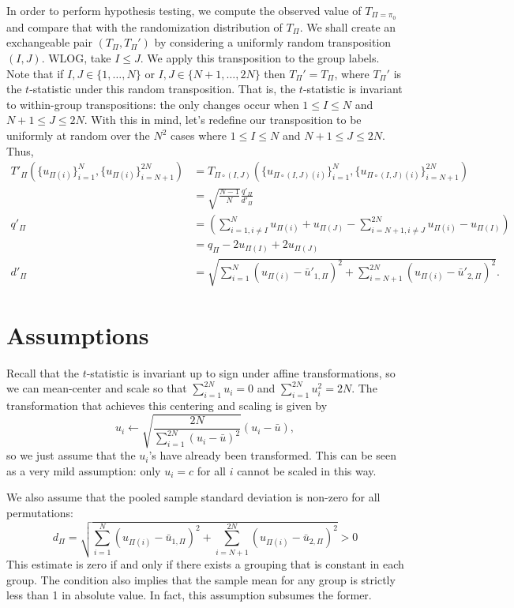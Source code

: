 In order to perform hypothesis testing, we compute the observed value
of $T_{\Pi=\pi_0}$ and compare that with the randomization
distribution of $T_{\Pi}$.  We shall create an exchangeable pair
$(T_{\Pi}, T_{\Pi}')$ by considering a uniformly random transposition
$(I, J)$.  WLOG, take $I \leq J$.  We apply this transposition to the
group labels.  Note that if $I, J \in \{1,\ldots,N\}$ or $I, J \in
\{N+1,\ldots,2N\}$ then $T_{\Pi}' = T_{\Pi}$, where $T_{\Pi}'$ is the
$t$-statistic under this random transposition.  That is, the
$t$-statistic is invariant to within-group transpositions: the only
changes occur when $1 \leq I \leq N$ and $N + 1 \leq J \leq 2N$.  With
this in mind, let's redefine our transposition to be uniformly at
random over the $N^2$ cases where $1 \leq I \leq N$ and $N + 1 \leq J
\leq 2N$. Thus,
\begin{align*}
  T'_{\Pi}(\{u_{\Pi(i)}\}_{i=1}^N, \{u_{\Pi(i)}\}_{i=N+1}^{2N})
  &= T_{\Pi \circ (I,J)}(\{u_{\Pi \circ (I,J)(i)}\}_{i=1}^N, \{u_{\Pi \circ (I,J)(i)}\}_{i=N+1}^{2N}) \\
  &= \sqrt{\frac{N-1}{N}}\frac{q'_{\Pi}}{d'_{\Pi}} \\
  q'_{\Pi} &= \left (\sum_{i=1, i\neq I}^N u_{\Pi(i)} + u_{\Pi(J)} -
    \sum_{i=N+1, i\neq J}^{2N}u_{\Pi(i)} - u_{\Pi(I)} \right ) \\
  &= q_{\Pi} - 2u_{\Pi(I)} + 2u_{\Pi(J)} \\
  d'_{\Pi} &= \sqrt{\sum_{i=1}^N(u_{\Pi(i)} - \bar{u}'_{1, \Pi})^{2} +
    \sum_{i=N+1}^{2N}(u_{\Pi(i)} - \bar{u}'_{2, \Pi})^{2}}.
\end{align*}

\section{Assumptions}
Recall that the $t$-statistic is invariant up to sign under affine
transformations, so we can mean-center and scale so that
$\sum_{i=1}^{2N} u_{i} = 0$ and $\sum_{i=1}^{2N} u_{i}^2 = 2N$.  The
transformation that achieves this centering and scaling is given by
\begin{equation}
  u_i \leftarrow \sqrt{\frac{2N}{\sum_{i=1}^{2N} (u_{i} - \bar{u})^2}}(u_{i}-\bar{u}),
\end{equation}
so we just assume that the $u_{i}$'s have already been transformed.
This can be seen as a very mild assumption: only $u_i = c$ for all $i$
cannot be scaled in this way.

We also assume that the pooled sample standard deviation is non-zero
for all permutations:
\begin{equation}
  \label{A:non-zero-std-dev}
  d_\Pi = \sqrt{\sum_{i=1}^N(u_{\Pi(i)} - \bar{u}_{1,\Pi})^2 +
    \sum_{i=N+1}^{2N}(u_{\Pi(i)} - \bar{u}_{2,\Pi})^2} > 0
\end{equation}
This estimate is zero if and only if there exists a grouping that is
constant in each group.  The condition also implies that the sample
mean for any group is strictly less than 1 in absolute value.  In
fact, this assumption subsumes the former.

